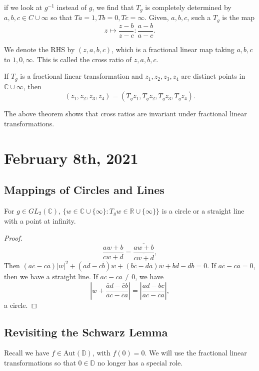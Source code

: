 \documentclass[12pt]{scrartcl}
\newcommand{\R}{\mathbb{R}}
\newcommand{\C}{\mathbb C}
\let \ol \overline
\begin{document}
if we look at $g^{-1}$ instead of $g$, we find that $T_g$ is completely determined by $a, b, c \in C \cup \infty$ so that $Ta = 1, T b = 0, T c = \infty$.    Given, $a, b, c$, such a $T_g$ is the map
$$z \mapsto \frac{z - b}{z - c}: \frac{a - b}{a - c}.$$

We denote the RHS by $(z, a, b, c)$, which is a fractional linear map taking $a, b, c$ to $1, 0, \infty$.  This is called the cross ratio of $z, a, b, c$.  

\begin{theorem}
If $T_g$ is a fractional linear transformation and $z_1, z_2, z_3, z_4$ are distinct points in $\C \cup \infty$, then
$$(z_1, z_2, z_3, z_4) = (T_g z_1, T_g z_2, T_g z_3, T_g z_4).$$
\end{theorem}
\begin{remark} The above theorem shows that cross ratios are invariant under fractional linear transformations.  
\end{remark}

\pagebreak
\section{February 8th, 2021}
\subsection{Mappings of Circles and Lines}
\begin{lemma} For $g \in GL_2(\C)$, $\{w \in \C\cup \{\infty\} : T_g w \in \R \cup \{\infty\}\}$ is a circle or a straight line with a point at infinity.
\end{lemma}
\begin{proof}
$$\frac{aw + b}{cw + d} = \frac{\ol{aw + b}}{\ol{cw + d}},$$
Then $(a\ol c - c\ol a) |w|^2 + (a\ol d - c \ol b) w + (b\ol c - d\ol a) \ol w + b\ol d - d\ol b = 0.$  If $a\ol c - c \ol a = 0$, then we have a straight line.  If $a\ol c - c \ol a \ne 0$, we have 
$$\left |w + \frac{\ol a d - \ol c b}{\ol a c - \ol c a} \right | = \left |\frac{ad - bc}{\ol a c - \ol c a}\right |,$$
 a circle.
\end{proof}

\subsection{Revisiting the Schwarz Lemma}
Recall we have $f \in \text{Aut}(\mathbb D)$, with $f(0) = 0$.  We will use the fractional linear transformations so that $0 \in \mathbb D$ no longer has a special role.  
\end{document}
